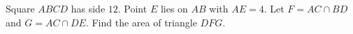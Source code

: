 Square $ABCD$ has side $12$. Point $E$ lies on $AB$ with $AE=4$. Let $F=AC\cap BD$ and $G=AC\cap DE$. Find the area of triangle $DFG$.

